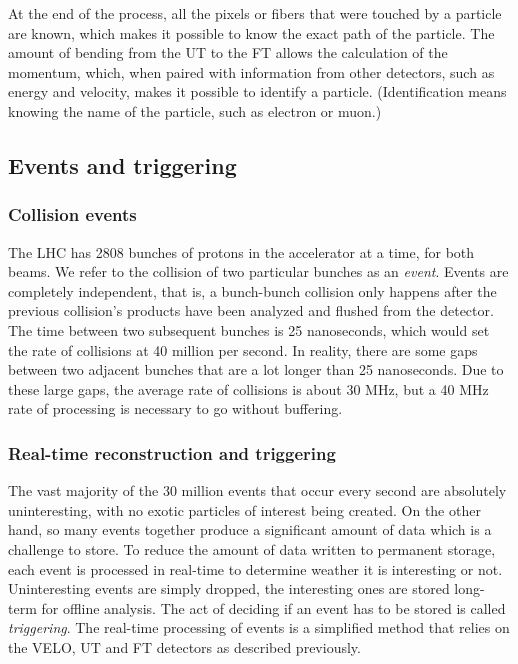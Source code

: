 \documentclass[12pt]{article}
\begin{document}
At the end of the process, all the pixels or fibers that were touched by a particle are known, which makes it possible to know the exact path of the particle. The amount of bending from the UT to the FT allows the calculation of the momentum, which, when paired with information from other detectors, such as energy and velocity, makes it possible to identify a particle. (Identification means knowing the name of the particle, such as electron or muon.)


\subsection{Events and triggering}\label{sec_events_trigger}


\subsubsection{Collision events}\label{sec_event_what}

The LHC has 2808 bunches of protons in the accelerator at a time, for both beams. We refer to the collision of two particular bunches as an \textit{event}. Events are completely independent, that is, a bunch-bunch collision only happens after the previous collision's products have been analyzed and flushed from the detector. The time between two subsequent bunches is 25 nanoseconds, which would set the rate of collisions at 40 million per second. In reality, there are some gaps between two adjacent bunches that are a lot longer than 25 nanoseconds. Due to these large gaps, the average rate of collisions is about 30 MHz, but a 40 MHz rate of processing is necessary to go without buffering.


\subsubsection{Real-time reconstruction and triggering}\label{sec_trigger_what}

The vast majority of the 30 million events that occur every second are absolutely uninteresting, with no exotic particles of interest being created. On the other hand, so many events together produce a significant amount of data which is a challenge to store. To reduce the amount of data written to permanent storage, each event is processed in real-time to determine weather it is interesting or not. Uninteresting events are simply dropped, the interesting ones are stored long-term for offline analysis. The act of deciding if an event has to be stored is called \textit{triggering}. The real-time processing of events is a simplified method that relies on the VELO, UT and FT detectors as described previously.
\end{document}
